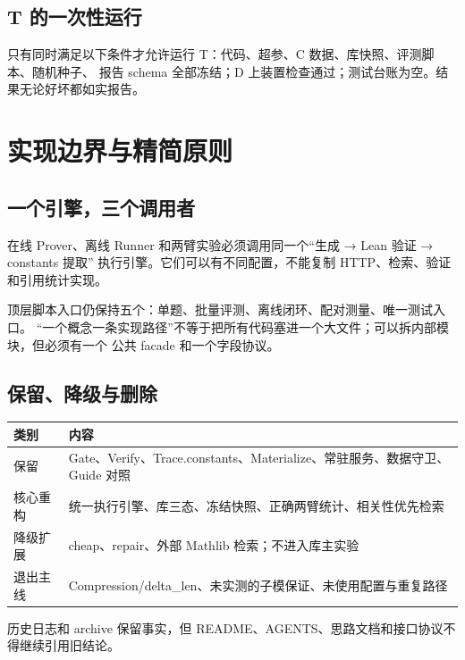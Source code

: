 \documentclass[UTF8,a4paper,11pt,fontset=windows]{ctexart}
\begin{document}
\subsection{T 的一次性运行}

只有同时满足以下条件才允许运行 T：代码、超参、C 数据、库快照、评测脚本、随机种子、
报告 schema 全部冻结；D 上装置检查通过；测试台账为空。结果无论好坏都如实报告。

\section{实现边界与精简原则}

\subsection{一个引擎，三个调用者}

在线 Prover、离线 Runner 和两臂实验必须调用同一个“生成 → Lean 验证 → constants 提取”
执行引擎。它们可以有不同配置，不能复制 HTTP、检索、验证和引用统计实现。

顶层脚本入口仍保持五个：单题、批量评测、离线闭环、配对测量、唯一测试入口。
“一个概念一条实现路径”不等于把所有代码塞进一个大文件；可以拆内部模块，但必须有一个
公共 facade 和一个字段协议。

\subsection{保留、降级与删除}

\begin{table}[htbp]
\centering
\small
\begin{tabularx}{\textwidth}{@{}p{2.0cm}Y@{}}
\toprule
\textbf{类别} & \textbf{内容} \\
\midrule
保留 & Gate、Verify、Trace.constants、Materialize、常驻服务、数据守卫、Guide 对照 \\
核心重构 & 统一执行引擎、库三态、冻结快照、正确两臂统计、相关性优先检索 \\
降级扩展 & cheap、repair、外部 Mathlib 检索；不进入库主实验 \\
退出主线 & Compression/delta\_len、未实测的子模保证、未使用配置与重复路径 \\
\bottomrule
\end{tabularx}
\end{table}

历史日志和 archive 保留事实，但 README、AGENTS、思路文档和接口协议不得继续引用旧结论。
\end{document}
